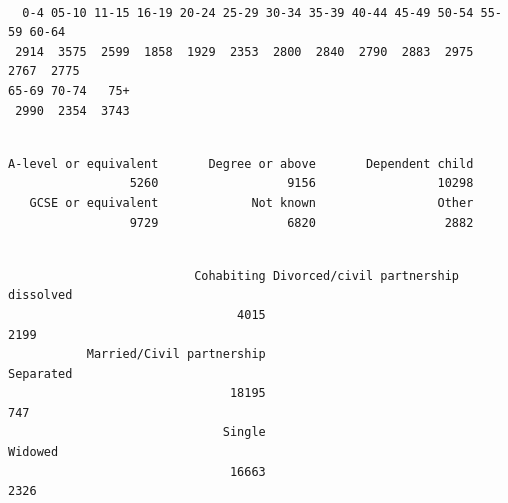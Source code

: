 \documentclass[
  letterpaper,
  DIV=11,
  numbers=noendperiod]{scrreprt}
\newenvironment{Shaded}{\begin{snugshade}}{\end{snugshade}}
\newcommand{\FunctionTok}[1]{\textcolor[rgb]{0.28,0.35,0.67}{#1}}
\newcommand{\NormalTok}[1]{\textcolor[rgb]{0.00,0.23,0.31}{#1}}
\newcommand{\SpecialCharTok}[1]{\textcolor[rgb]{0.37,0.37,0.37}{#1}}
\begin{document}
\begin{verbatim}

  0-4 05-10 11-15 16-19 20-24 25-29 30-34 35-39 40-44 45-49 50-54 55-59 60-64 
 2914  3575  2599  1858  1929  2353  2800  2840  2790  2883  2975  2767  2775 
65-69 70-74   75+ 
 2990  2354  3743 
\end{verbatim}

\begin{Shaded}
\end{Shaded}

\begin{verbatim}

A-level or equivalent       Degree or above       Dependent child 
                 5260                  9156                 10298 
   GCSE or equivalent             Not known                 Other 
                 9729                  6820                  2882 
\end{verbatim}

\begin{Shaded}
\end{Shaded}

\begin{verbatim}

                          Cohabiting Divorced/civil partnership dissolved 
                                4015                                 2199 
           Married/Civil partnership                            Separated 
                               18195                                  747 
                              Single                              Widowed 
                               16663                                 2326 
\end{verbatim}

\begin{Shaded}
\end{Shaded}
\end{document}
